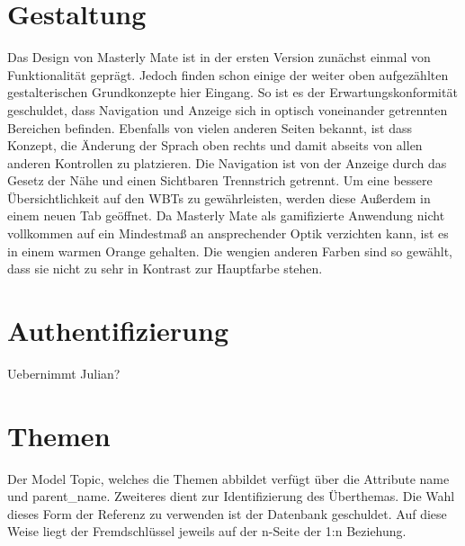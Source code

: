 \section{Gestaltung}
Das Design von Masterly Mate ist in der ersten Version zunächst einmal von
Funktionalität geprägt. Jedoch finden schon einige der weiter oben aufgezählten
gestalterischen Grundkonzepte hier Eingang. So ist es der Erwartungskonformität
geschuldet, dass Navigation und Anzeige sich in optisch voneinander getrennten
Bereichen befinden. Ebenfalls von vielen anderen Seiten bekannt, ist dass
Konzept, die Änderung der Sprach oben rechts und damit abseits von allen anderen
Kontrollen zu platzieren. Die Navigation ist von der Anzeige durch das Gesetz
der Nähe und einen Sichtbaren Trennstrich getrennt. Um eine bessere
Übersichtlichkeit auf den WBTs zu gewährleisten, werden diese Außerdem in einem
neuen Tab geöffnet. Da Masterly Mate als gamifizierte Anwendung nicht vollkommen
auf ein Mindestmaß an ansprechender Optik verzichten kann, ist es in einem
warmen Orange gehalten. Die wengien anderen Farben sind so gewählt, dass sie
nicht zu sehr in Kontrast zur Hauptfarbe stehen.

\section{Authentifizierung}
\begin{k}
Uebernimmt Julian?
\end{k}

\section{Themen}
Der Model Topic, welches die Themen abbildet verfügt über die Attribute name und
parent\_name. Zweiteres dient zur Identifizierung des Überthemas. Die Wahl
dieses Form der Referenz zu verwenden ist der Datenbank geschuldet. Auf diese Weise
liegt der Fremdschlüssel jeweils auf der n-Seite der 1:n Beziehung.